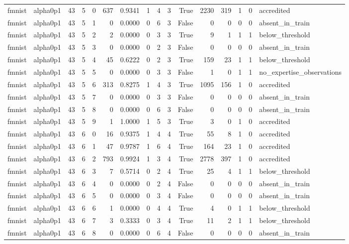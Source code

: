 \begin{tabular}{llrrrrrrrrrrrrrl}
fmnist & alpha0p1 & 43 & 5 & 0 & 637 & 0.9341 & 1 & 4 & 3 & True & 2230 & 319 & 1 & 0 & accredited \\
fmnist & alpha0p1 & 43 & 5 & 1 & 0 & 0.0000 & 0 & 6 & 3 & False & 0 & 0 & 0 & 0 & absent\_in\_train \\
fmnist & alpha0p1 & 43 & 5 & 2 & 2 & 0.0000 & 0 & 3 & 3 & True & 9 & 1 & 1 & 1 & below\_threshold \\
fmnist & alpha0p1 & 43 & 5 & 3 & 0 & 0.0000 & 0 & 2 & 3 & False & 0 & 0 & 0 & 0 & absent\_in\_train \\
fmnist & alpha0p1 & 43 & 5 & 4 & 45 & 0.6222 & 0 & 2 & 3 & True & 159 & 23 & 1 & 1 & below\_threshold \\
fmnist & alpha0p1 & 43 & 5 & 5 & 0 & 0.0000 & 0 & 3 & 3 & False & 1 & 0 & 1 & 1 & no\_expertise\_observations \\
fmnist & alpha0p1 & 43 & 5 & 6 & 313 & 0.8275 & 1 & 4 & 3 & True & 1095 & 156 & 1 & 0 & accredited \\
fmnist & alpha0p1 & 43 & 5 & 7 & 0 & 0.0000 & 0 & 3 & 3 & False & 0 & 0 & 0 & 0 & absent\_in\_train \\
fmnist & alpha0p1 & 43 & 5 & 8 & 0 & 0.0000 & 0 & 6 & 3 & False & 0 & 0 & 0 & 0 & absent\_in\_train \\
fmnist & alpha0p1 & 43 & 5 & 9 & 1 & 1.0000 & 1 & 5 & 3 & True & 3 & 0 & 1 & 0 & accredited \\
fmnist & alpha0p1 & 43 & 6 & 0 & 16 & 0.9375 & 1 & 4 & 4 & True & 55 & 8 & 1 & 0 & accredited \\
fmnist & alpha0p1 & 43 & 6 & 1 & 47 & 0.9787 & 1 & 6 & 4 & True & 164 & 23 & 1 & 0 & accredited \\
fmnist & alpha0p1 & 43 & 6 & 2 & 793 & 0.9924 & 1 & 3 & 4 & True & 2778 & 397 & 1 & 0 & accredited \\
fmnist & alpha0p1 & 43 & 6 & 3 & 7 & 0.5714 & 0 & 2 & 4 & True & 25 & 4 & 1 & 1 & below\_threshold \\
fmnist & alpha0p1 & 43 & 6 & 4 & 0 & 0.0000 & 0 & 2 & 4 & False & 0 & 0 & 0 & 0 & absent\_in\_train \\
fmnist & alpha0p1 & 43 & 6 & 5 & 0 & 0.0000 & 0 & 3 & 4 & False & 0 & 0 & 0 & 0 & absent\_in\_train \\
fmnist & alpha0p1 & 43 & 6 & 6 & 1 & 0.0000 & 0 & 4 & 4 & True & 4 & 0 & 1 & 1 & below\_threshold \\
fmnist & alpha0p1 & 43 & 6 & 7 & 3 & 0.3333 & 0 & 3 & 4 & True & 11 & 2 & 1 & 1 & below\_threshold \\
fmnist & alpha0p1 & 43 & 6 & 8 & 0 & 0.0000 & 0 & 6 & 4 & False & 0 & 0 & 0 & 0 & absent\_in\_train \\

\end{tabular}
